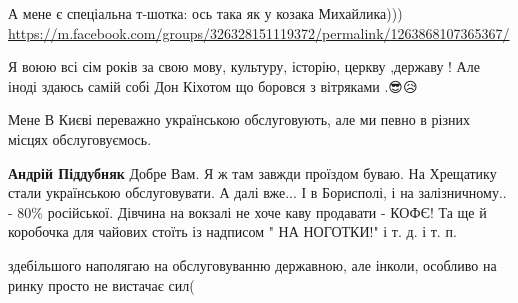 \begin{itemize}
А мене є спеціальна т-шотка: ось така як у козака Михайлика)))
\url{https://m.facebook.com/groups/326328151119372/permalink/1263868107365367/}

 

Я воюю всі сім років за свою мову, культуру, історію, церкву ,державу !
Але іноді здаюсь самій собі Дон Кіхотом що боровся з вітряками .😎😥

 
Мене В Києві переважно українською обслуговують, але ми певно в різних місцях обслуговуємось.

\begin{itemize}
 
\textbf{Андрій Піддубняк} Добре Вам. Я ж там завжди проїздом буваю. На
Хрещатику стали українською обслуговувати. А далі вже... І в Борисполі, і на
залізничному.. - 80\% російської. Дівчина на вокзалі не хоче каву продавати -
КОФЄ! Та ще й коробочка для чайових стоїть із надписом " НА НОГОТКИ!" і т. д. і
т. п.
\end{itemize}

 
здебільшого наполягаю на обслуговуванню державною, але інколи, особливо на
ринку просто не вистачає сил(

 


\end{itemize}
